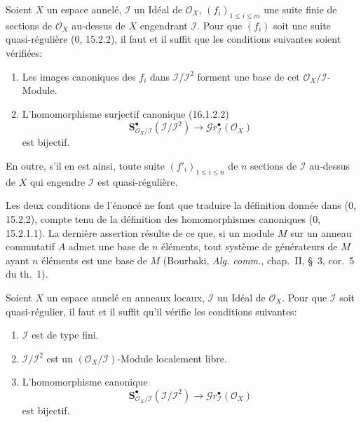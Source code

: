 \begin{proposition}[16.9.3]
\label{IV.16.9.3}
Soient $X$ un espace annelé, $\mathscr{I}$ un Idéal de $\mathcal{O}_X$,
$(f_i)_{1\leq i\leq m}$ une suite finie de sections de $\mathcal{O}_X$
au-dessus de $X$ engendrant $\mathscr{I}$. Pour que $(f_i)$ soit une suite
quasi-régulière (0, 15.2.2), il faut et il suffit que les conditions suivantes
soient vérifiées:
\begin{enumerate}
  \item[(i)] Les images canoniques des $f_i$ dans
  $\mathscr{I}/\mathscr{I}^2$ forment une base de cet
  $\mathcal{O}_X/\mathscr{I}$-Module.
  \item[(ii)] L'homomorphisme surjectif canonique (16.1.2.2)
  \[
    \mathbf{S}_{\mathcal{O}_X/\mathscr{I}}^{\bullet}
    (\mathscr{I}/\mathscr{I}^2)
    \longrightarrow\mathscr{G}r_{\mathscr{I}}^{\bullet}(\mathcal{O}_X)
  \]
  est bijectif.
\end{enumerate}
En outre, s'il en est ainsi, toute suite $(f'_i)_{1\leq i\leq n}$ de $n$
sections de $\mathscr{I}$ au-dessus de $X$ qui engendre $\mathscr{I}$ est
quasi-régulière.
\end{proposition}


Les deux conditions de l'énoncé ne font que traduire la définition donnée dans
(0, 15.2.2), compte tenu de la définition des homomorphismes canoniques
(0, 15.2.1.1). La dernière assertion résulte de ce que, si un module $M$ sur
un anneau commutatif $A$ admet une base de $n$ éléments, tout système de
générateurs de $M$ ayant $n$ éléments est une base de $M$ (Bourbaki,
\emph{Alg. comm.}, chap.~II, §~3, cor.~5 du th.~1).

\begin{corollary}[16.9.4]
\label{IV.16.9.4}
Soient $X$ un espace annelé en anneaux locaux, $\mathscr{I}$ un Idéal de
$\mathcal{O}_X$. Pour que $\mathscr{I}$ soit quasi-régulier, il faut et il
suffit qu'il vérifie les conditions suivantes:
\begin{enumerate}
  \item[(i)] $\mathscr{I}$ est de type fini.
  \item[(ii)] $\mathscr{I}/\mathscr{I}^2$ est un
  $(\mathcal{O}_X/\mathscr{I})$-Module localement libre.
  \item[(iii)] L'homomorphisme canonique
  \[
    \mathbf{S}_{\mathcal{O}_X/\mathscr{I}}^{\bullet}
    (\mathscr{I}/\mathscr{I}^2)
    \longrightarrow\mathscr{G}r_{\mathscr{I}}^{\bullet}(\mathcal{O}_X)
    \tag{16.9.4.1}
    \label{IV.16.9.4.1}
  \]
  est bijectif.
\end{enumerate}
\end{corollary}

